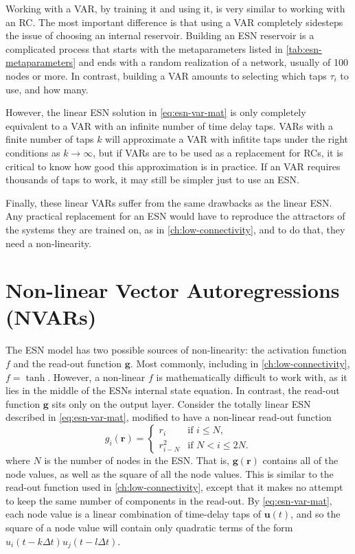 Working with a VAR, by training it and using it, is very similar to
working with an RC. The most important difference is that using a VAR
completely sidesteps the issue of choosing an internal
reservoir. Building an ESN reservoir is a complicated process that
starts with the metaparameters listed in \cref{tab:esn-metaparameters}
and ends with a random realization of a network, usually of 100 nodes
or more. In contrast, building a VAR amounts to selecting which taps
$\tau_i$ to use, and how many.

However, the linear ESN solution in \cref{eq:esn-var-mat} is only
completely equivalent to a VAR with an infinite number of time delay
taps. VARs with a finite number of taps $k$ will approximate a VAR
with infitite taps under the right conditions as $k \rightarrow
\infty$\cite{bollt2021}, but if VARs are to be used as a replacement
for RCs, it is critical to know how good this approximation is in
practice. If an VAR requires thousands of taps to work, it may still
be simpler just to use an ESN.

Finally, these linear VARs suffer from the same drawbacks as the
linear ESN. Any practical replacement for an ESN would have to
reproduce the attractors of the systems they are trained on, as in
\cref{ch:low-connectivity}, and to do that, they need a non-linearity.

\section{Non-linear Vector Autoregressions (NVARs)}

The ESN model has two possible sources of non-linearity: the
activation function $f$ and the read-out function $\bm{g}$. Most
commonly, including in \cref{ch:low-connectivity}, $f =
\tanh$. However, a non-linear $f$ is mathematically difficult to work
with, as it lies in the middle of the ESNs internal state equation. In
contrast, the read-out function $\bm{g}$ sits only on the output
layer. Consider the totally linear ESN described in
\cref{eq:esn-var-mat}, modified to have a non-linear read-out function
\begin{equation}
  g_i(\bm{r}) = \begin{cases}
    r_i & \text{if } i \leq N, \\
    r_{i - N}^2 & \text{if } N < i \leq 2N.
  \end{cases}
  \label{eq:esn-quadratic-out}
\end{equation}
where $N$ is the number of nodes in the ESN.  That is,
$\bm{g}(\bm{r})$ contains all of the node values, as well as the
square of all the node values. This is similar to the read-out
function used in \cref{ch:low-connectivity}, except that it makes no
attempt to keep the same number of components in the read-out. By
\cref{eq:esn-var-mat}, each node value is a linear combination of
time-delay taps of $\bm{u}(t)$, and so the square of a node value will
contain only quadratic terms of the form $u_i(t-k\Delta
t)u_j(t-l\Delta t)$.

